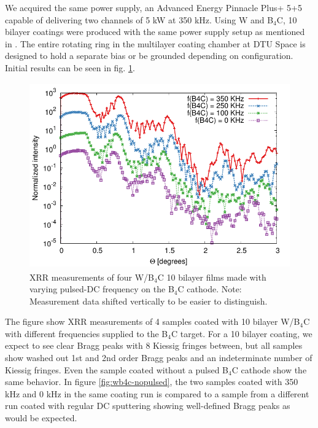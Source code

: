 We acquired the same power supply, an Advanced Energy Pinnacle Plus+ 5+5 capable of delivering two channels of 5 kW at 350 kHz. Using W and B$_4$C, 10 bilayer coatings were produced with the same power supply setup as mentioned in \cite{Pei:2009gn}. The entire rotating ring in the multilayer coating chamber at DTU Space is designed to hold a separate bias or be grounded depending on configuration. Initial results can be seen in fig. \ref{fig:wb4c-pulsed}.

\begin{figure}[!h]
	\center
	\includegraphics[height=8cm]{figures/athena/coatings/w-b4c_pulsed_2.pdf}
\caption{\footnotesize XRR measurements of four W/B$_4$C 10 bilayer films made with varying pulsed-DC frequency on the B$_4$C cathode. Note: Measurement data shifted vertically to be easier to distinguish.}\label{fig:wb4c-pulsed}
\end{figure}

The figure show XRR measurements of 4 samples coated with 10 bilayer W/B$_4$C with different frequencies supplied to the B$_4$C target. For a 10 bilayer coating, we expect to see clear Bragg peaks with 8 Kiessig\cite{Kiessig:1931vo} fringes between, but all samples show washed out 1st and 2nd order Bragg peaks and an indeterminate number of Kiessig fringes. Even the sample coated without a pulsed B$_4$C cathode show the same behavior. In figure \ref{fig:wb4c-nopulsed}, the two samples coated with 350 kHz and 0 kHz in the same coating run is compared to a sample from a different run coated with regular DC sputtering showing well-defined Bragg peaks as would be expected.

